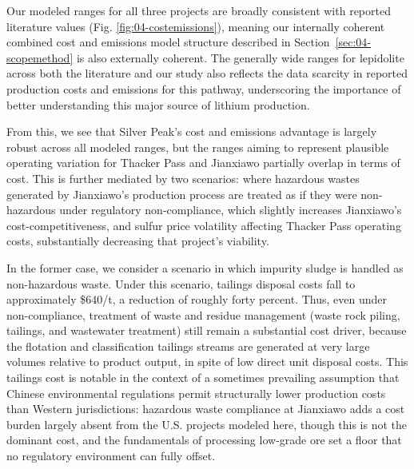 \documentclass{article}
\renewcommand\_{\textunderscore\allowbreak}
\begin{document}
Our modeled ranges for all three projects are broadly consistent with reported literature values (Fig. \ref{fig:04-costemissions}), meaning our internally coherent combined cost and emissions model structure described in Section~\ref{sec:04-scopemethod} is also externally coherent. The generally wide ranges for lepidolite across both the literature and our study also reflects the data scarcity in reported production costs and emissions for this pathway, underscoring the importance of better understanding this major source of lithium production.

From this, we see that Silver Peak's cost and emissions advantage is largely robust across all modeled ranges, but the ranges aiming to represent plausible operating variation for Thacker Pass and Jianxiawo partially overlap in terms of cost. This is further mediated by two scenarios: where hazardous wastes generated by Jianxiawo's production process are treated as if they were non-hazardous under regulatory non-compliance, which slightly increases Jianxiawo's cost-competitiveness, and sulfur price volatility affecting Thacker Pass operating costs, substantially decreasing that project's viability. 

In the former case, we consider a scenario in which impurity sludge is handled as non-hazardous waste. Under this scenario, tailings disposal costs fall to approximately \$640/t, a reduction of roughly forty percent. Thus, even under non-compliance, treatment of waste and residue management (waste rock piling, tailings, and wastewater treatment) still remain a substantial cost driver, because the flotation and classification tailings streams are generated at very large volumes relative to product output, in spite of low direct unit disposal costs. This tailings cost is notable in the context of a sometimes prevailing assumption that Chinese environmental regulations permit structurally lower production costs than Western jurisdictions: hazardous waste compliance at Jianxiawo adds a cost burden largely absent from the U.S. projects modeled here, though this is not the dominant cost, and the fundamentals of processing low-grade ore set a floor that no regulatory environment can fully offset. 
\end{document}

